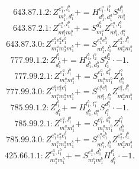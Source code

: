 \documentclass[letterpaper,10pt,fleqn,leqno,onecolumn]{article}
\begin{document}
\begin{equation} \;\;\;\;\;\;  643.87.1.2: Z^{e_{1}^{a},l_{1}^{b}}_{m_{1}^{b},d_{1}^{a}}+=H^{e_{1}^{a},l_{1}^{b}}_{d_{1}^{b},d_{1}^{a}}S^{d_{1}^{b}}_{m_{1}^{b}} \end{equation}
\begin{equation} \;\;\;\;\;\;  643.87.2.1: Z^{e_{1}^{a},l_{1}^{b}}_{m_{1}^{a}m_{1}^{b}}+=S^{d_{1}^{a}}_{m_{1}^{a}}Z^{e_{1}^{a},l_{1}^{b}}_{m_{1}^{b},d_{1}^{a}} \end{equation}
\begin{equation} \;\;\;\;\;\;  643.87.3.0: Z^{e_{1}^{a}e_{2}^{a}e_{1}^{b}}_{m_{1}^{a}m_{2}^{a}m_{1}^{b}}+=S^{e_{1}^{a}e_{1}^{b}}_{m_{1}^{a},l_{1}^{b}}Z^{e_{2}^{a},l_{1}^{b}}_{m_{2}^{a}m_{1}^{b}} \end{equation}
\begin{equation} \;\;\;\;\;\;  777.99.1.2: Z^{l_{1}^{b}}_{d_{1}^{b}}+=H^{l_{1}^{b},l_{2}^{b}}_{d_{1}^{b},d_{2}^{b}}S^{d_{2}^{b}}_{l_{2}^{b}}\cdot -1. \end{equation}
\begin{equation} \;\;\;\;\;\;  777.99.2.1: Z^{e_{1}^{a},l_{1}^{b}}_{m_{1}^{a}m_{1}^{b}}+=S^{e_{1}^{a},d_{1}^{b}}_{m_{1}^{a}m_{1}^{b}}Z^{l_{1}^{b}}_{d_{1}^{b}} \end{equation}
\begin{equation} \;\;\;\;\;\;  777.99.3.0: Z^{e_{1}^{a}e_{2}^{a}e_{1}^{b}}_{m_{1}^{a}m_{2}^{a}m_{1}^{b}}+=S^{e_{1}^{a}e_{1}^{b}}_{m_{1}^{a},l_{1}^{b}}Z^{e_{2}^{a},l_{1}^{b}}_{m_{2}^{a}m_{1}^{b}} \end{equation}
\begin{equation} \;\;\;\;\;\;  785.99.1.2: Z^{l_{1}^{b}}_{d_{1}^{b}}+=H^{l_{1}^{b},l_{1}^{a}}_{d_{1}^{b},d_{1}^{a}}S^{d_{1}^{a}}_{l_{1}^{a}}\cdot -1. \end{equation}
\begin{equation} \;\;\;\;\;\;  785.99.2.1: Z^{e_{1}^{a},l_{1}^{b}}_{m_{1}^{a}m_{1}^{b}}+=S^{e_{1}^{a},d_{1}^{b}}_{m_{1}^{a}m_{1}^{b}}Z^{l_{1}^{b}}_{d_{1}^{b}} \end{equation}
\begin{equation} \;\;\;\;\;\;  785.99.3.0: Z^{e_{1}^{a}e_{2}^{a}e_{1}^{b}}_{m_{1}^{a}m_{2}^{a}m_{1}^{b}}+=S^{e_{1}^{a}e_{1}^{b}}_{m_{1}^{a},l_{1}^{b}}Z^{e_{2}^{a},l_{1}^{b}}_{m_{2}^{a}m_{1}^{b}} \end{equation}
\begin{equation} \;\;\;\;\;\;  425.66.1.1: Z^{e_{1}^{a},l_{1}^{b}}_{m_{1}^{a}m_{1}^{b}}+=S^{e_{1}^{a},d_{1}^{b}}_{m_{1}^{a}m_{1}^{b}}H^{l_{1}^{b}}_{d_{1}^{b}}\cdot -1. \end{equation}
\end{document}
